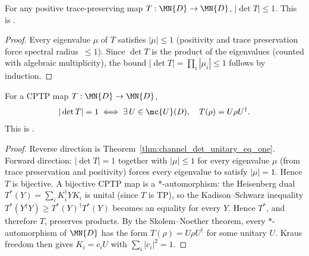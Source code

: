 \begin{theorem}
    \label{thm:channelDet_norm_le_one}
    \leanok
    For any positive trace-preserving map $T : \MN{D} \to \MN{D}$,
    $|\det T| \le 1$.
    This is \cite[Theorem~6.1(1)]{Wolf2012Quantum}.
\end{theorem}

\begin{proof}\leanok
    Every eigenvalue $\mu$ of $T$ satisfies $|\mu| \le 1$
    (positivity and trace preservation force spectral radius~$\le 1$).
    Since $\det T$ is the product of the eigenvalues
    (counted with algebraic multiplicity), the bound
    $|\det T| = \prod_i |\mu_i| \le 1$ follows by induction.
\end{proof}

\begin{theorem}
    \label{thm:channelDet_norm_eq_one_iff_unitary}
    \leanok
    For a CPTP map $T : \MN{D} \to \MN{D}$,
    \[
        |\det T| = 1
        \iff
        \exists\, U \in \mc{U}(D),\quad T(\rho) = U\rho U^\dagger.
    \]
    This is \cite[Theorem~6.1(2)]{Wolf2012Quantum}.
\end{theorem}

\begin{proof}
    \leanok
    Reverse direction is Theorem~\ref{thm:channel_det_unitary_eq_one}.
    Forward direction: $|\det T| = 1$ together with $|\mu| \le 1$ for every
    eigenvalue $\mu$ (from trace preservation and positivity) forces every
    eigenvalue to satisfy $|\mu| = 1$. Hence $T$ is bijective. A bijective
    CPTP map is a $*$-automorphism: the Heisenberg dual
    $T^*(Y) = \sum_i K_i^\dagger Y K_i$ is unital (since $T$ is TP), so the
    Kadison--Schwarz inequality
    $T^*(Y^\dagger Y) \ge T^*(Y)^\dagger T^*(Y)$ becomes an equality for every
    $Y$. Hence $T^*$, and therefore $T$, preserves products. By the
    Skolem--Noether theorem, every $*$-automorphism of $\MN{D}$ has the form
    $T(\rho) = U \rho U^\dagger$ for some unitary $U$. Kraus freedom then
    gives $K_i = c_i U$ with $\sum_i |c_i|^2 = 1$.
\end{proof}
